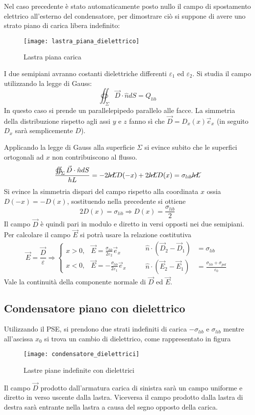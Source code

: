 Nel caso precedente è stato automaticamente posto nullo il 
campo di spostamento elettrico all'esterno del condensatore, per
dimostrare ciò si suppone di avere uno strato piano di carica libera indefinito:
\begin{figure}[H]
\centering
\texttt{[image: lastra\_piana\_dielettrico]}
\caption{Lastra piana carica}
\end{figure}
I due semipiani avranno costanti dielettriche differenti $\varepsilon_1$ 
ed $\varepsilon_2$.
Si studia il campo utilizzando la legge di Gauss:
$$
\oiint_{\Sigma} \vec{D}\cdot\hat{n}dS = Q_{lib}
$$
In questo caso si prende un parallelepipedo parallelo alle facce. La 
simmetria della distribuzione rispetto agli assi $y$ e $z$ fanno sì
che $\vec{D} = D_x(x)\vec{e}_x$ (in seguito $D_x$ sarà semplicemente $D$).

Applicando la legge di Gauss alla superficie $\Sigma$ si evince subito
che le superfici ortogonali ad $x$ non contribuiscono al flusso.
$$
\frac{\oiint_\Sigma \vec{D} \cdot \hat{n} dS }{hL}= -2\cancel{hL} D(-x) + 2\cancel{hL}D(x) = 
\sigma_{lib}\cancel{hL}
$$
Si evince la simmetria dispari del campo rispetto alla coordinata $x$ 
ossia $D(-x) = -D(x)$, sostituendo nella precedente si ottiene
$$
2D(x) = \sigma_{lib} \Rightarrow D(x) = \frac{\sigma_{lib}}{2}
$$
Il campo $\vec{D}$ è quindi pari in modulo e diretto in versi opposti
nei due semipiani. Per calcolare il campo $\vec{E}$ si potrà usare
la relazione costitutiva
$$
\vec{E} = \frac{\vec{D}}{\varepsilon}\Rightarrow
\begin{cases}
x > 0, & \vec{E}=\frac{\sigma_{lib}}{2\varepsilon_2} \vec{e}_x \\
x < 0, & \vec{E} = -\frac{\sigma_{lib}}{2\varepsilon_1} \vec{e}_x
\end{cases}\qquad
\begin{aligned}
\hat{n}\cdot(\vec{D}_2-\vec{D}_1) &= \sigma_{lib}\\
\hat{n}\cdot (\vec{E}_2-\vec{E}_1) &= \frac{\sigma_{lib}+\sigma_{pol}}{\varepsilon_0}
\end{aligned}
$$
Vale la continuità della componente normale di $\vec{D}$ ed $\vec{E}$.

\subsection{Condensatore piano con dielettrico}
Utilizzando il PSE, si prendono due strati indefiniti di carica $-\sigma_{lib}$ e $\sigma_{lib}$ mentre all'ascissa $x_0$ si trova un
cambio di dielettrico, come rappresentato in figura
\begin{figure}[H]
\centering
\texttt{[image: condensatore\_dielettrici]}
\caption{Lastre piane indefinite con dielettrici}
\end{figure}
Il campo $\vec{D}$ prodotto dall'armatura carica di sinistra sarà un campo uniforme
e diretto in verso uscente dalla lastra. Viceversa il campo prodotto
dalla lastra di destra sarà entrante nella lastra a causa del segno
opposto della carica.

